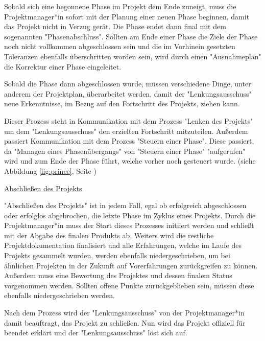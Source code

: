 Sobald sich eine begonnene Phase im Projekt dem Ende zuneigt, muss die Projektmanager*in sofort mit der Planung einer neuen Phase beginnen, damit das Projekt nicht in Verzug gerät. Die Phase endet dann final mit dem sogenannten "Phasenabschluss". Sollten am Ende einer Phase die Ziele der Phase noch nicht vollkommen abgeschlossen sein und die im Vorhinein gesetzten Toleranzen ebenfalls überschritten worden sein, wird durch einen "Ausnahmeplan" die Korrektur einer Phase eingeleitet. \cite{Prince2}

Sobald die Phase dann abgeschlossen wurde, müssen verschiedene Dinge, unter anderem der Projektplan, überarbeitet werden, damit der "Lenkungsausschuss" neue Erkenntnisse, im Bezug auf den Fortschritt des Projekts, ziehen kann. \cite{Prince2}

Dieser Prozess steht in Kommunikation mit dem Prozess "Lenken des Projekts" um dem "Lenkungsausschuss" den erzielten Fortschritt mitzuteilen. Außerdem passiert Kommunikation mit dem Prozess "Steuern einer Phase". Diese passiert, da "Managen eines Phasenübergangs" von "Steuern einer Phase" "aufgerufen" wird und zum Ende der Phase führt, welche vorher noch gesteuert wurde. (siehe Abbildung \ref{fig:prince}, Seite \pageref{fig:prince}) \cite{Prince2}

\underline{Abschließen des Projekts}

"Abschließen des Projekts" ist in jedem Fall, egal ob erfolgreich abgeschlossen oder erfolglos abgebrochen, die letzte Phase im Zyklus eines Projekts. Durch die Projektmanager*in muss der Start dieses Prozesses initiiert werden und schließt mit der Abgabe des finalen Produkts ab. Weiters wird die restliche Projektdokumentation finalisiert und alle Erfahrungen, welche im Laufe des Projekts gesammelt wurden, werden ebenfalls niedergeschrieben, um bei ähnlichen Projekten in der Zukunft auf Vorerfahrungen zurückgreifen zu können. Außerdem muss eine Bewertung des Projektes und dessen finalem Status vorgenommen werden. Sollten offene Punkte zurückgeblieben sein, müssen diese ebenfalls niedergeschrieben werden. \cite{Prince2}

Nach dem Prozess wird der "Lenkungsausschuss" von der Projektmanager*in damit beauftragt, das Projekt zu schließen. Nun wird das Projekt offiziell für beendet erklärt und der "Lenkungsausschuss" löst sich auf. \cite{Prince2}
